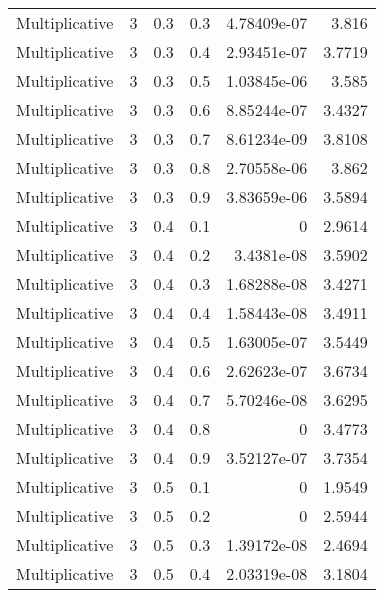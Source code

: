 \documentclass{article}
\begin{document}
\begin{longtable}[H]{lrrrrr}
 Multiplicative &       3 &   0.3 &            0.3 &      4.78409e-07 &          3.816  \\
 Multiplicative &       3 &   0.3 &            0.4 &      2.93451e-07 &          3.7719 \\
 Multiplicative &       3 &   0.3 &            0.5 &      1.03845e-06 &          3.585  \\
 Multiplicative &       3 &   0.3 &            0.6 &      8.85244e-07 &          3.4327 \\
 Multiplicative &       3 &   0.3 &            0.7 &      8.61234e-09 &          3.8108 \\
 Multiplicative &       3 &   0.3 &            0.8 &      2.70558e-06 &          3.862  \\
 Multiplicative &       3 &   0.3 &            0.9 &      3.83659e-06 &          3.5894 \\
 Multiplicative &       3 &   0.4 &            0.1 &      0           &          2.9614 \\
 Multiplicative &       3 &   0.4 &            0.2 &      3.4381e-08  &          3.5902 \\
 Multiplicative &       3 &   0.4 &            0.3 &      1.68288e-08 &          3.4271 \\
 Multiplicative &       3 &   0.4 &            0.4 &      1.58443e-08 &          3.4911 \\
 Multiplicative &       3 &   0.4 &            0.5 &      1.63005e-07 &          3.5449 \\
 Multiplicative &       3 &   0.4 &            0.6 &      2.62623e-07 &          3.6734 \\
 Multiplicative &       3 &   0.4 &            0.7 &      5.70246e-08 &          3.6295 \\
 Multiplicative &       3 &   0.4 &            0.8 &      0           &          3.4773 \\
 Multiplicative &       3 &   0.4 &            0.9 &      3.52127e-07 &          3.7354 \\
 Multiplicative &       3 &   0.5 &            0.1 &      0           &          1.9549 \\
 Multiplicative &       3 &   0.5 &            0.2 &      0           &          2.5944 \\
 Multiplicative &       3 &   0.5 &            0.3 &      1.39172e-08 &          2.4694 \\
 Multiplicative &       3 &   0.5 &            0.4 &      2.03319e-08 &          3.1804 \\

\end{longtable}
\end{document}
